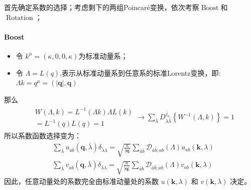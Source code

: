 首先确定系数的选择；考虑剩下的两组Poincar\'e变换，依次考察$\operatorname{Boost}$和$\operatorname{Rotation}$；
\paragraph*{Boost}
\begin{itemize}
    \item 令 $k^\mu = (\kappa,0,0,\kappa)$为标准动量系；
    \item 令 $\Lambda=L(q)$,表示从标准动量系到任意系的标准Lorentz变换，即:$\Lambda k=q^\mu=(|\boldsymbol{q}|,\boldsymbol{q})$
\end{itemize}
那么 
\[\begin{aligned}
    \begin{aligned}
    &W(\Lambda,k)=L^{-1}(\Lambda k)\Lambda L(k)\\
    &=L^{-1}(q) L(q)=1
    \end{aligned}\to\sum_{\bar{\lambda}}D_{\lambda \bar{\lambda}}^{j_n}\!\left\{W^{-1}(\Lambda,k)\right\} =1
\end{aligned}\]
所以系数函数选择变为：
\begin{subequations}
    \begin{align}
        &\sum_{\bar{\lambda}}u_{\bar{a}\bar{b}}(\boldsymbol{q},\bar{\lambda})\delta_{\bar{\lambda}\lambda}=\sqrt{\frac{\kappa}{|\boldsymbol{q}|}}\sum_{\bar{a}\bar{b}}\mathscr{D}_{\bar{a}\bar{b};ab}(\Lambda)u_{ab}(\boldsymbol{k},\lambda)
        \\
        &\sum_{\bar{\lambda}}v_{\bar{a}\bar{b}}(\boldsymbol{q},\bar{\lambda})\delta_{\bar{\lambda}\lambda}=\sqrt{\frac{\kappa}{|\boldsymbol{q}|}}\sum_{\bar{a}\bar{b}}\mathscr{D}_{\bar{a}\bar{b};ab}(\Lambda)v_{ab}(\boldsymbol{k},\lambda)
    \end{align}
\end{subequations}
因此，任意动量处的系数完全由标准动量处的系数 $u(\boldsymbol{k},\lambda)$ 和 $v(\boldsymbol{k},\lambda)$ 决定。
